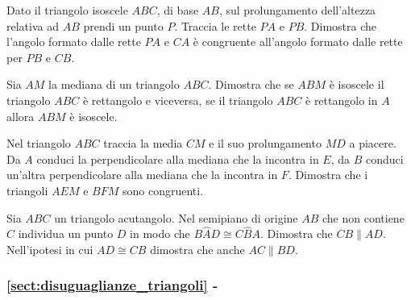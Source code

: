 \begin{multicols}{2}
\begin{multicols}{2}
\begin{esercizio}
\label{ese:3.70}
Dato il triangolo isoscele $ABC$, di base $AB$, sul prolungamento 
dell'altezza relativa ad $AB$ prendi un punto $P$. Traccia le rette 
$PA$ e $PB$. Dimostra che l'angolo formato dalle rette $PA$ e $CA$ è 
congruente all'angolo formato dalle rette per $PB$ e $CB$.
\end{esercizio}

\begin{esercizio}
\label{ese:3.74}
Sia $AM$ la mediana di un triangolo $ABC$. Dimostra che se $ABM$ è 
isoscele il triangolo $ABC$ è rettangolo e viceversa, se il triangolo 
$ABC$ è rettangolo in $A$ allora $ABM$ è isoscele.
\end{esercizio}

\begin{esercizio}
\label{ese:3.78}
Nel triangolo $ABC$ traccia la media $CM$ e il suo prolungamento $MD$ 
a piacere. Da $A$ conduci la perpendicolare alla mediana che la 
incontra in $E$, da $B$ conduci un'altra perpendicolare alla mediana 
che la incontra in $F$. Dimostra che i triangoli $AEM$ e $BFM$ sono 
congruenti.
\end{esercizio}

\begin{esercizio}
\label{ese:3.81}
Sia $ABC$ un triangolo acutangolo. Nel semipiano di origine $AB$ che 
non contiene $C$ individua un punto $D$ in modo che 
$B\widehat{A}D\cong C\widehat{B}A$. Dimostra che $CB\parallel AD$. 
Nell'ipotesi in cui $AD\cong CB$ dimostra che anche $AC\parallel BD$.
\end{esercizio}

\end{multicols}

\begingroup
\hypersetup{linkcolor=black}
\subsubsection*{\ref{sect:disuguaglianze_triangoli} - 
}
\endgroup


\end{multicols}
